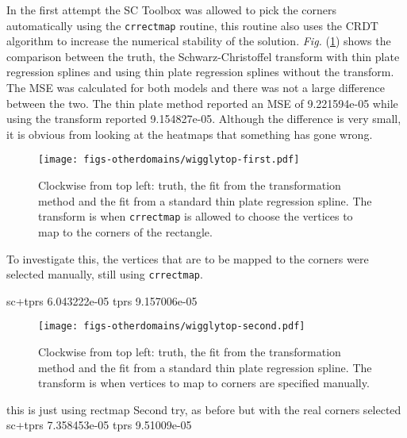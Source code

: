 \documentclass[a4paper,10pt]{amsart}
\newcommand{\sch}{Schwarz-Christoffel }
\newcommand{\Fig}[1]{\emph{Fig.} (\ref{#1})}
\begin{document}
In the first attempt the SC Toolbox was allowed to pick the corners automatically using the \texttt{crrectmap} routine, this routine also uses the CRDT algorithm to increase the numerical stability of the solution. \Fig{wigglyfirstcomp} shows the comparison between the truth, the \sch transform with thin plate regression splines and using thin plate regression splines without the transform. The MSE was calculated for both models and there was not a large difference between the two. The thin plate method reported an MSE of 9.221594e-05 while using the transform reported 9.154827e-05. Although the difference is very small, it is obvious from looking at the heatmaps that something has gone wrong.

\begin{figure}
\centering
\texttt{[image: figs-otherdomains/wigglytop-first.pdf]} \\
\caption{Clockwise from top left: truth, the fit from the transformation method and the fit from a standard thin plate regression spline. The transform is when \texttt{crrectmap} is allowed to choose the vertices to map to the corners of the rectangle.}
\label{wigglyfirstcomp}
\end{figure}

To investigate this, the vertices that are to be mapped to the corners were selected manually, still using \texttt{crrectmap}. 

sc+tprs 6.043222e-05 
tprs 9.157006e-05 


\begin{figure}
\centering
\texttt{[image: figs-otherdomains/wigglytop-second.pdf]} \\
\caption{Clockwise from top left: truth, the fit from the transformation method and the fit from a standard thin plate regression spline. The transform is when vertices to map to corners are specified manually.}
\label{wigglyseccomp}
\end{figure}




this is just using rectmap
Second try, as before but with the real corners selected
sc+tprs 7.358453e-05 
tprs 9.51009e-05 












\end{document}
